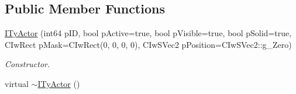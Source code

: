 \subsection*{Public Member Functions}
\begin{DoxyCompactItemize}
\item 
\hyperlink{class_i_ty_actor_afb266117deb0b8be81325ce76ef7c95b}{ITyActor} (int64 pID, bool pActive=true, bool pVisible=true, bool pSolid=true, CIwRect pMask=CIwRect(0, 0, 0, 0), CIwSVec2 pPosition=CIwSVec2::g\_\-Zero)
\begin{DoxyCompactList}\small\item\em Constructor. \end{DoxyCompactList}\item 
\hypertarget{class_i_ty_actor_afc1f27393487c6422303523195c3922c}{
virtual \hyperlink{class_i_ty_actor_afc1f27393487c6422303523195c3922c}{$\sim$ITyActor} ()}
\label{class_i_ty_actor_afc1f27393487c6422303523195c3922c}


\end{DoxyCompactItemize}
